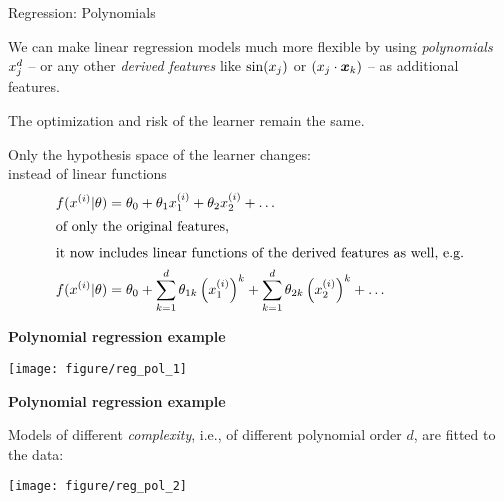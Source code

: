 \begin{vbframe}{Regression: Polynomials}

We can make linear regression models much more flexible by using \emph{polynomials} $x_j^d$ -- or any other \emph{derived features} like $\sin(x_j)$ or $(x_j \cdot \bm{x}_k)$ -- as additional features.\\

\lz

The optimization and risk of the learner remain the same.\\
\lz

Only the hypothesis space of the learner changes:\\ 
instead of linear functions 
\begin{align*}
f(x^{(i)} | \theta) &= \theta_0 + \theta_1 x^{(i)}_1 + \theta_2 x^{(i)}_2 + \dots\\
\intertext{of only the original features,}
\intertext{it now includes linear functions of the derived features as well, e.g.} 
f(x^{(i)} | \theta) &= \theta_0 + \sum^d_{k=1} \theta_{1k} \left(x^{(i)}_1\right)^k + \sum^d_{k=1} \theta_{2k} \left(x^{(i)}_2\right)^k + \dots
\end{align*}
\framebreak

\textbf{Polynomial regression example}

 \lz

\begin{knitrout}\scriptsize
{}\color{fgcolor}

{\centering \texttt{[image: figure/reg\_pol\_1]} 

}



\end{knitrout}

\framebreak

\textbf{Polynomial regression example}

Models of different \emph{complexity}, i.e., of different polynomial order $d$, are fitted to the data:

\begin{knitrout}\scriptsize
{}\color{fgcolor}

{\centering \texttt{[image: figure/reg\_pol\_2]} 

}



\end{knitrout}

\framebreak


\end{vbframe}
